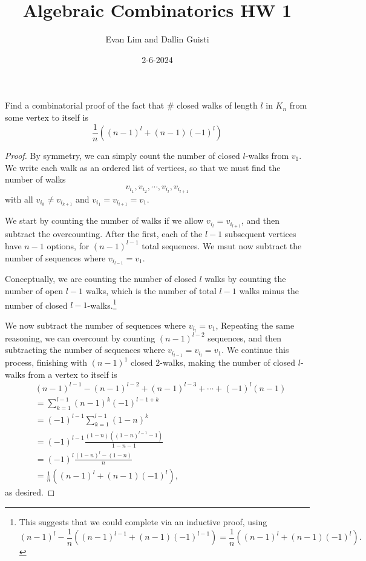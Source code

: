 \documentclass[11pt]{scrartcl}
\title{Algebraic Combinatorics HW 1}
\author{Evan Lim and Dallin Guisti}
\date{2-6-2024}
\begin{document}
\maketitle
\setcounter{section}{1}
\begin{problem}[\textcolor{red}{Closed Walks in $K_n$}]
    Find a combinatorial proof of the fact that $\#$ closed walks of length $l$ in $K_n$ from some vertex to itself is \[\frac{1}{n}\left((n-1)^l+(n-1)(-1)^l\right)\]
\end{problem}
\begin{proof}
    By symmetry, we can simply count the number of closed $l$-walks from $v_1$. We write each walk as an ordered list of vertices, so that we must find the number of walks 
    \[v_{i_1},v_{i_2},\cdots,v_{i_{l}},v_{i_{l+1}}\] with all $v_{i_k}\neq v_{i_{k+1}}$ and $v_{i_1}=v_{i_{l+1}}= v_1$. 
    
    We start by counting the number of walks if we allow $v_{i_l}=v_{i_{l+1}}$, and then subtract the overcounting. After the first, each of the $l-1$ subsequent vertices have $n-1$ options, for $(n-1)^{l-1}$ total sequences. We msut now subtract the number of sequences where $v_{i_{l-1}}=v_1$. 
    
    Conceptually, we are counting the number of closed $l$ walks by counting the number of open $l-1$ walks, which is the number of total $l-1$ walks minus the number of closed $l-1$-walks.\footnote{This suggests that we could complete via an inductive proof, using \[(n-1)^{l}-\frac{1}{n}\left((n-1)^{l-1}+(n-1)(-1)^{l-1}\right)=\frac{1}{n}\left((n-1)^{l}+(n-1)(-1)^l\right).\]}
    
    We now subtract the number of sequences where $v_{i_{l}}=v_1$, 
    Repeating the same reasoning, we can overcount by counting $(n-1)^{l-2}$ sequences, and then subtracting the number of sequences where $v_{i_{l-1}}=v_{i_l}=v_1$. We continue this process, finishing with $(n-1)^1$ closed $2$-walks, making the number of closed $l$-walks from a vertex to itself is
    \begin{align*}
        &(n-1)^{l-1}-(n-1)^{l-2}+(n-1)^{l-3}+\cdots+(-1)^l(n-1)\\
        &=\sum_{k=1}^{l-1}(n-1)^k(-1)^{l-1+k}\\
        &=(-1)^{l-1}\sum_{k=1}^{l-1}(1-n)^k\\
        &=(-1)^{l-1}\frac{(1-n)\left((1-n)^{l-1}-1\right)}{1-n-1}\\
        &=(-1)^{l}\frac{(1-n)^{l}-(1-n)}{n}\\
        &=\frac{1}{n}\left((n-1)^l+(n-1)(-1)^l\right),
    \end{align*}
    as desired.
\end{proof}
\end{document}
